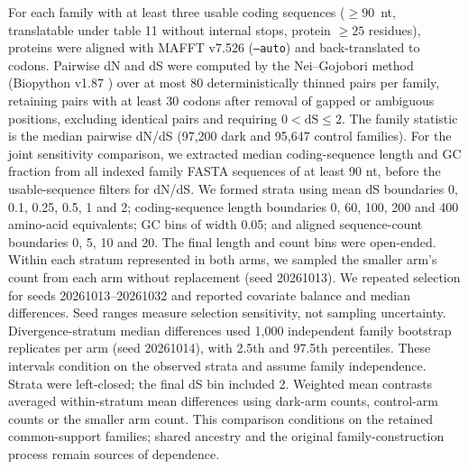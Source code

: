 \documentclass[11pt]{article}
\begin{document}
For each family with at least three usable coding sequences ($\geq 90$~nt, translatable under table
11 without internal stops, protein $\geq 25$ residues), proteins were aligned with MAFFT v7.526
(\texttt{--auto}) \citep{katoh2013mafft} and back-translated to codons. Pairwise dN and dS were computed
by the Nei--Gojobori method \citep{nei1986dnds} (Biopython v1.87 \citep{cock2009biopython}) over at most
80 deterministically thinned pairs per family, retaining pairs with at least 30 codons after removal
of gapped or ambiguous positions, excluding identical pairs and requiring $0 < \mathrm{dS} \leq 2$.
The family statistic is the median pairwise dN/dS (97{,}200 dark and 95{,}647 control families).
For the joint sensitivity comparison, we extracted median coding-sequence length and GC
fraction from all indexed family FASTA sequences of at least 90 nt, before the usable-sequence filters for dN/dS. We formed strata using mean dS boundaries
0, 0.1, 0.25, 0.5, 1 and 2; coding-sequence length boundaries 0, 60, 100, 200 and 400 amino-acid
equivalents; GC bins of width 0.05; and aligned sequence-count boundaries 0, 5, 10 and 20.
The final length and count bins were open-ended. Within each stratum represented in both arms,
we sampled the smaller arm's count from each arm without replacement (seed 20261013).
We repeated selection for seeds 20261013--20261032 and reported covariate balance and median
differences. Seed ranges measure selection sensitivity, not sampling uncertainty. Divergence-stratum median differences used 1{,}000 independent family bootstrap replicates per arm (seed 20261014), with 2.5th and 97.5th percentiles. These intervals condition on the observed strata and assume family independence. Strata were left-closed; the final dS bin included 2. Weighted mean contrasts averaged within-stratum mean differences using dark-arm counts, control-arm counts or the smaller arm count. This comparison conditions on the retained common-support families; shared ancestry
and the original family-construction process remain sources of dependence.
\end{document}
